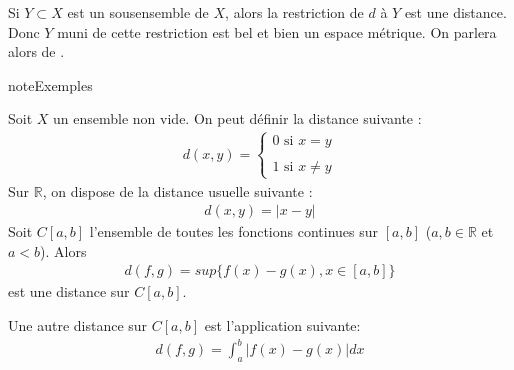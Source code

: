 \documentclass[letterpaper,10pt,french]{sphinxmanual}
\begin{document}
\sphinxAtStartPar
Si \(Y \subset X\) est un sous\sphinxhyphen{}ensemble de \(X\), alors la restriction de \(d\) à \(Y\) est une distance. Donc \(Y\) muni de cette restriction est bel et bien un espace métrique. On parlera alors de .

\begin{sphinxadmonition}{note}{Exemples}

\sphinxhyphen{} Soit \(X\) un ensemble non vide. On peut définir la distance suivante :
\begin{equation*}
\begin{split}
d(x,y) = \begin{cases}
0 \mbox{ si } x = y \\\\
1 \mbox{ si } x \neq y
\end{cases}
\end{split}
\end{equation*}
\sphinxhyphen{} Sur \(\mathbb R\), on dispose de la distance usuelle suivante :
\begin{equation*}
\begin{split}
d(x,y)=|x-y|
\end{split}
\end{equation*}
\sphinxhyphen{} Soit \(C[a, b]\) l’ensemble de toutes les fonctions continues sur \([a, b]\) (\(a, b \in \mathbb R\) et \(a<b\)). Alors
\begin{equation*}
\begin{split}
d(f, g)=sup\{f(x)-g(x), x \in [a, b]\}
\end{split}
\end{equation*}
\sphinxAtStartPar
est une distance sur \(C[a, b]\).

\sphinxhyphen{} Une autre distance sur \(C[a, b]\) est l’application suivante:
\begin{equation*}
\begin{split}
d(f,g)=\int_a^b |f(x)-g(x)|dx
\end{split}
\end{equation*}\end{sphinxadmonition}
\end{document}
